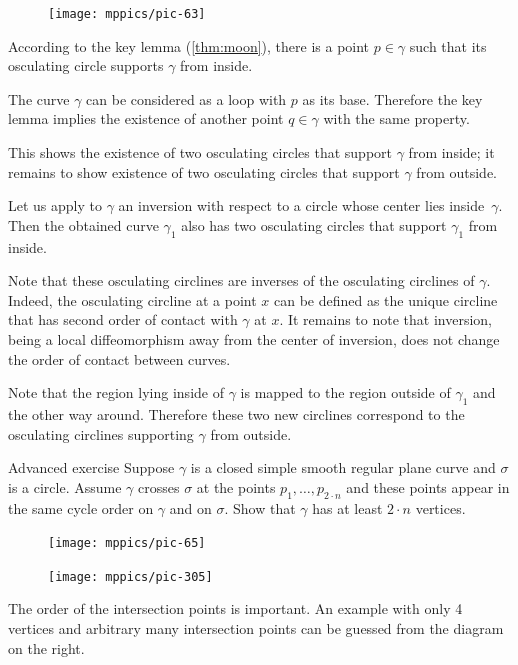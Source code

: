 \documentclass{article}
\begin{document}
\begin{figure}
\vskip-0mm
\centering
\texttt{[image: mppics/pic-63]}
\vskip0mm
\end{figure}

According to the key lemma (\ref{thm:moon}), there is a point $p\in\gamma$ such that its osculating circle supports $\gamma$ from inside.

The curve $\gamma$ can be considered as a loop with $p$ as its base.
Therefore the key lemma implies the existence of another point $q\in\gamma$ with the same property.

This shows the existence of two osculating circles that support $\gamma$ from inside;
it remains to show existence of two osculating circles that support $\gamma$ from outside.

Let us apply to $\gamma$ an inversion with respect to a circle whose center lies inside~$\gamma$.
Then the obtained curve $\gamma_1$ also has  two osculating circles that support $\gamma_1$ from inside.

Note that these osculating circlines are inverses of the osculating circlines of $\gamma$.
Indeed, the osculating circline at a point $x$ can be defined as the unique circline that has second order of contact with $\gamma$ at $x$.
It remains to note that inversion, being a local diffeomorphism away from the center of inversion, does not change the order of contact between curves.

Note that the region lying inside of $\gamma$ is mapped to the region outside of $\gamma_1$ and the other way around.
Therefore these two new circlines correspond to the osculating circlines supporting $\gamma$ from outside.
\qeds

\begin{thm}{Advanced exercise}\label{ex:curve-crosses-circle}
Suppose $\gamma$ is a closed simple smooth regular plane curve and $\sigma$ is a circle.
Assume $\gamma$ crosses $\sigma$ at the points $p_1,\dots,p_{2{\cdot} n}$ and these points appear in the same cycle order on $\gamma$ and on $\sigma$.
Show that $\gamma$ has at least $2\cdot n$ vertices.
\end{thm}


\begin{figure}[!ht]
\begin{minipage}{.48\textwidth}
\centering
\texttt{[image: mppics/pic-65]}
\end{minipage}\hfill
\begin{minipage}{.48\textwidth}
\centering
\texttt{[image: mppics/pic-305]}
\end{minipage}
\end{figure}

The order of the intersection points is important. 
An example with only 4 vertices and arbitrary many intersection points can be guessed from the diagram on the right. 



\sloppy
\printbibliography[heading=bibintoc]
\fussy
\end{document}
